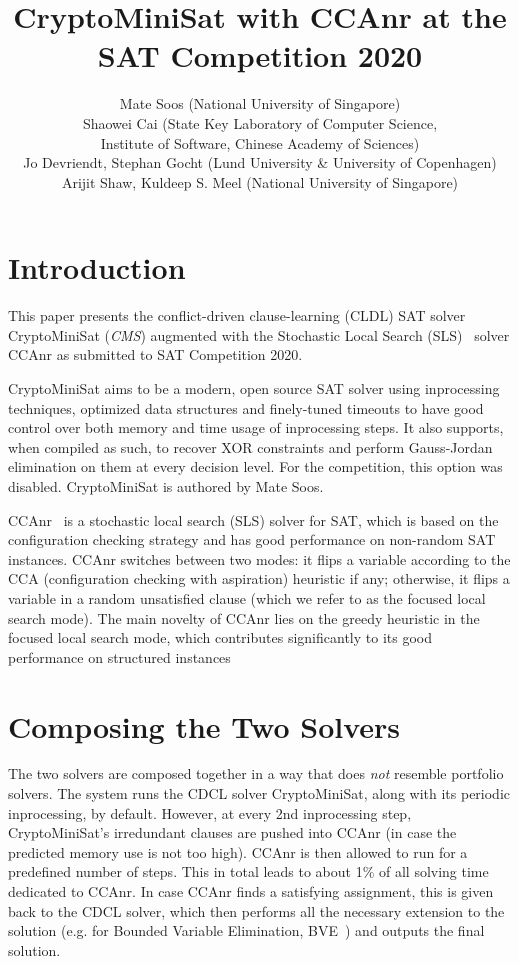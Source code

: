 \documentclass[final]{ieee}
\begin{document}
\title{CryptoMiniSat with CCAnr at the SAT Competition 2020}
\author{Mate Soos (National University of Singapore)\\
Shaowei Cai (State Key Laboratory of Computer Science,\\
Institute of Software, Chinese Academy of Sciences)\\
Jo Devriendt, Stephan Gocht (Lund University \& University of Copenhagen)\\
Arijit Shaw, Kuldeep S. Meel (National University of Singapore)}

\maketitle
\thispagestyle{empty}
\pagestyle{empty}

\section{Introduction}
This paper presents the conflict-driven clause-learning (CLDL) SAT solver CryptoMiniSat (\emph{CMS}) augmented with the Stochastic Local Search (SLS)~\cite{DBLP:conf/sat/CaiLS15} solver CCAnr as submitted to SAT Competition 2020.

CryptoMiniSat aims to be a modern, open source SAT solver using inprocessing techniques, optimized data structures and finely-tuned timeouts to have good control over both memory and time usage of inprocessing steps. It also supports, when compiled as such, to recover XOR constraints and perform Gauss-Jordan elimination on them at every decision level. For the competition, this option was disabled. CryptoMiniSat is authored by Mate Soos.

CCAnr~\cite{DBLP:conf/sat/CaiLS15} is a stochastic local search (SLS) solver for SAT, which is based on the configuration checking strategy and has good performance on non-random SAT instances. CCAnr switches between two modes: it flips a variable according to the CCA (configuration checking with aspiration) heuristic if any; otherwise, it flips a variable in a random unsatisfied clause (which we refer to as the focused local search mode). The main novelty of CCAnr lies on the greedy heuristic in the focused local search mode, which contributes significantly to its good performance on structured instances

\section{Composing the Two Solvers}
The two solvers are composed together in a way that does \emph{not} resemble portfolio solvers. The system runs the CDCL solver CryptoMiniSat, along with its periodic inprocessing, by default. However, at every 2nd inprocessing step, CryptoMiniSat's irredundant clauses are pushed into CCAnr (in case the predicted memory use is not too high). CCAnr is then allowed to run for a predefined number of steps. This in total leads to about 1\% of all solving time dedicated to CCAnr. In case CCAnr finds a satisfying assignment, this is given back to the CDCL solver, which then performs all the necessary extension to the solution (e.g. for Bounded Variable Elimination, BVE~\cite{BVE}) and outputs the final solution.
\end{document}

